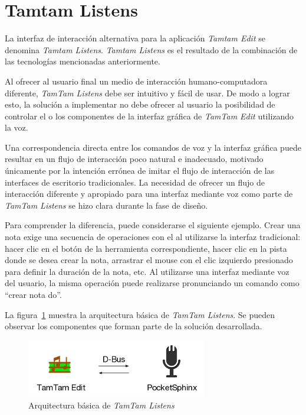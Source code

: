 \section{Tamtam Listens}
\label{sec:tamtam-listens}
La interfaz de interacci\'on alternativa para la aplicaci\'on \emph{Tamtam Edit} se denomina  
\emph{Tamtam Listens}. \emph{Tamtam Listens} es el resultado de la combinaci\'on
de las tecnolog\'ias mencionadas anteriormente.


Al ofrecer al usuario final un medio de interacci\'on humano-computadora diferente, \emph{TamTam Listens}
debe ser intuitivo y f\'acil de usar. De modo a lograr esto, la soluci\'on a implementar no debe 
ofrecer al usuario la posibilidad de controlar el  o los componentes de la interfaz 
gr\'afica de \emph{TamTam Edit} utilizando la voz. 

Una correspondencia directa entre los comandos de voz y la interfaz gr\'afica puede resultar en 
un flujo de interacci\'on poco natural e inadecuado, motivado únicamente por la intención errónea 
de imitar el flujo de interacci\'on de las interfaces de escritorio tradicionales. 
La necesidad de ofrecer un flujo de interacción diferente y apropiado para una interfaz mediante voz
como parte de \emph{TamTam Listens} se hizo clara durante la fase de dise\~no.

Para comprender la diferencia, puede considerarse el siguiente ejemplo. 
Crear una nota exige una secuencia de operaciones con el  al utilizarse la
interfaz tradicional: hacer clic en el bot\'on de la herramienta correspondiente, hacer clic en la pista
donde se desea crear la nota, arrastrar el mouse con el clic izquierdo presionado para definir la 
duraci\'on de la nota, etc. Al utilizarse una interfaz mediante voz del usuario, la misma operaci\'on
puede realizarse pronunciando un comando como ``crear nota do''.


La figura~\ref{figure:tamtam-listens-arq} muestra la arquitectura b\'asica de \emph{TamTam Listens}. Se pueden
observar los componentes que forman parte de la soluci\'on desarrollada.

\begin{figure}[H] 
\centering
\includegraphics[width=0.7\textwidth]{./graphics/tamtam-listens-arq.png}
\caption{Arquitectura b\'asica de \emph{TamTam Listens}}
\label{figure:tamtam-listens-arq}
\end{figure}

